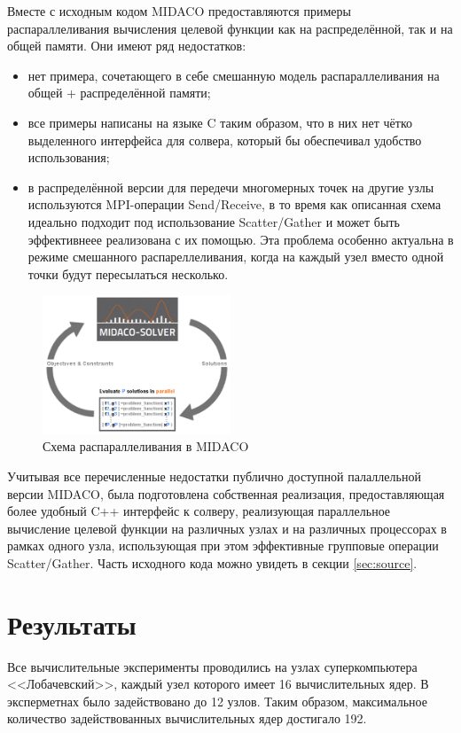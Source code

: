 \documentclass[a4paper]{article}
\begin{document}
Вместе с исходным кодом MIDACO предоставляются примеры распараллеливания вычисления целевой функции как на распределённой,
так и на общей памяти. Они имеют ряд недостатков:
\begin{itemize}
  \item нет примера, сочетающего в себе смешанную модель распараллеливания на
  общей + распределённой памяти;
  \item все примеры написаны на языке C таким образом, что в них нет чётко выделенного интерфейса для солвера,
  который бы обеспечивал удобство использования;
  \item в распределённой версии для передечи многомерных точек на другие узлы используются
  MPI-операции Send/Receive, в то время как описанная схема идеально подходит под использование
  Scatter/Gather и может быть эффективнеее реализована с их помощью. Эта проблема особенно актуальна в режиме смешанного
  распареллеливания, когда на каждый узел вместо одной точки будут пересылаться несколько.
\end{itemize}

\begin{figure}[H]
  \center
  \includegraphics[width=0.5\textwidth]{parallel_loop.png}
  \caption{Схема распараллеливания в MIDACO}
  \label{fig:midaco}
\end{figure}

Учитывая все перечисленные недостатки публично доступной палаллельной версии MIDACO, была
подготовлена собственная реализация, предоставляющая более удобный C++ интерфейс к солверу,
реализующая параллельное вычисление целевой функции на различных узлах и на различных процессорах в
рамках одного узла, использующая при этом эффективные групповые операции Scatter/Gather.
Часть исходного кода можно увидеть в секции \ref{sec:source}.

\section{Результаты}

Все вычислительные эксперименты проводились на узлах суперкомпьютера <<Лобачевский>>, каждый узел которого
имеет 16 вычислительных ядер. В эксперметнах было задействовано до 12 узлов. Таким образом, максимальное
количество задействованных вычислительных ядер достигало 192.
\end{document}

